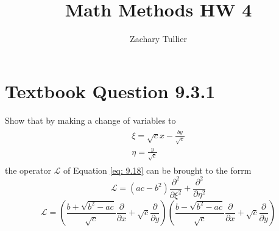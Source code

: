 \documentclass[12pt]{article}
\begin{document}
\singlespacing  %
\title{Math Methods HW 4}

\author[1]{Zachary Tullier}
\date{}
\maketitle




\section*{Textbook Question 9.3.1}
    Show that by making a change of variables to 
    \begin{gather*}
        \begin{split}
            \xi = \sqrt{c} x - \frac{b y}{\sqrt{c}}
            \\
            \eta = \frac{y}{\sqrt{c}}
        \end{split}
    \end{gather*}
    the operator $\mathcal{L}$ of Equation \ref{eq: 9.18} can be brought to the forrm 
    \[
        \mathcal{L} = (ac - b^2) \frac{\partial^2}{\partial \xi^2} + \frac{\partial^2}{\partial \eta^2}
    \]
    \begin{equation} \label{eq: 9.18}
        \mathcal{L} = \left(\frac{b + \sqrt{b^2 - ac}}{\sqrt{c}} \frac{\partial}{\partial x} + \sqrt{c} \frac{\partial}{\partial y} \right) \left(\frac{b - \sqrt{b^2 - ac}}{\sqrt{c}} \frac{\partial}{\partial x} + \sqrt{c} \frac{\partial}{\partial y} \right)
    \end{equation} 
    
\end{document}
